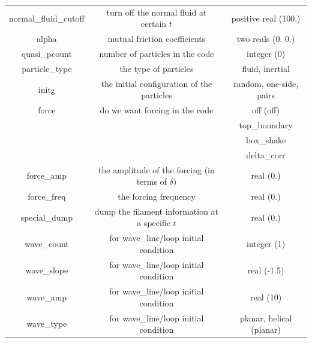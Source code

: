 \documentclass[12pt]{article}
\begin{document}
\begin{flushleft}
\begin{tabular}{|c|c|c|}
normal\_fluid\_cutoff & turn off the normal fluid at certain $t$ & positive real (100.) \\
alpha & mutual friction coefficients & two reals (0. 0.) \\
quasi\_pcount & number of particles in the code & integer (0) \\
particle\_type & the type of particles & fluid, inertial \\
initg & the initial configuration of the particles & random, one-side, pairs\\
force & do we want forcing in the code & off (off)\\
                 &                           & top\_boundary \\
                 &                           & box\_shake \\
                 &                           & delta\_corr \\
force\_amp & the amplitude of the forcing (in terms of $\delta$)& real (0.)\\
force\_freq & the forcing frequency & real (0.)\\
special\_dump & dump the filament information at a specific $t$& real (0.)\\
wave\_count & for wave\_line/loop initial condition & integer (1)\\
wave\_slope & for wave\_line/loop initial condition & real (-1.5)\\
wave\_amp & for wave\_line/loop initial condition & real (10)\\
wave\_type & for wave\_line/loop initial condition & planar, helical (planar)\\
    \hline
\end{tabular}
\end{flushleft}
\end{document}
